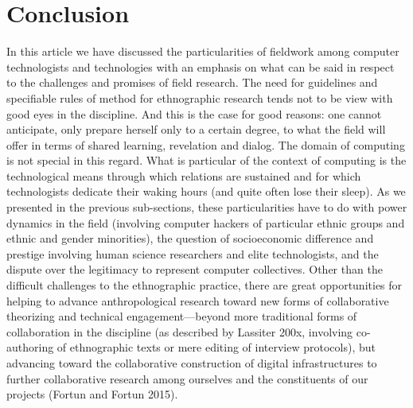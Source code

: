 \documentclass[10pt,letter,oneside]{scrartcl}
\begin{document}


\section{Conclusion}

In this article we have discussed the particularities of fieldwork among 
computer technologists and technologies with an emphasis on what can be 
said in respect to the challenges and promises of field research. The 
need for guidelines and specifiable rules of method for ethnographic 
research tends not to be view with good eyes in the discipline. And
this is the case for good reasons: one cannot anticipate, only 
prepare herself only to a certain degree, to what the field will
offer in terms of shared learning, revelation and dialog. The domain
of computing is not special in this regard. What is particular of
the context of computing is the technological means through which 
relations are sustained and for which technologists dedicate their
waking hours (and quite often lose their sleep). As we presented
in the previous sub-sections, these particularities have to do with
power dynamics in the field (involving computer hackers of particular
ethnic groups and ethnic and gender minorities), the question of 
socioeconomic difference and prestige involving human science 
researchers and elite technologists, and the dispute over the 
legitimacy to represent computer collectives. Other than the
difficult challenges to the ethnographic practice, there are 
great opportunities for helping to advance anthropological
research toward new forms of collaborative theorizing and
technical engagement---beyond more traditional forms of collaboration
in the discipline (as described by Lassiter 200x, involving co-authoring
of ethnographic texts or mere editing of interview protocols), but
advancing toward the collaborative construction of digital infrastructures
to further collaborative research among ourselves and the constituents
of our projects (Fortun and Fortun 2015).



\end{document}
